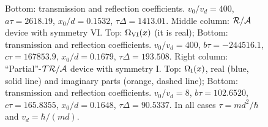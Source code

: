 \begin{figure}
{  Bottom:  transmission and reflection coefficients. $v_0/v_d=400$, $a\tau = 2618.19$,
  $x_0/d = 0.1532$, $\tau\Delta = 1413.01$.
  Middle column: ${\cal R/A}$ device with symmetry VI.
  Top: $\Omega_{\rm VI} (x)$ (it is real); Bottom:  transmission and reflection coefficients. $v_0/v_d=400$,
  $b \tau =  -244516.1$,
  $c\tau = 167853.9$,
  $x_0/d = 0.1679$,
  $\tau\Delta= 193.508$.
  Right column: ``Partial''-${\cal TR/A}$ device with symmetry I.
  Top:  $\Omega_{\rm I}(x)$, real (blue, solid line) and imaginary parts (orange, dashed line);
  Bottom: transmission and reflection coefficients. $v_0/v_d=8$, $b\tau =  102.6520$,
  $c \tau =  165.8355$,
  $x_0/d = 0.1648$,
  $\tau\Delta= 90.5337$. In all cases $\tau={m d^2}/{\hbar}$ and $v_{d} = {\hbar}/({m d})$.
  \label{fig_t_a}}
\end{figure}

